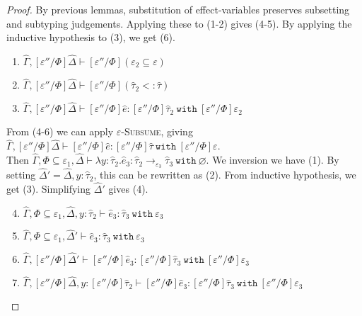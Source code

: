 \documentclass{llncs}
\newcommand{\keywadj}[1]{\mathtt{#1}}
\newcommand{\keyw}[1]{\keywadj{#1}~}
\newcommand{\kw}[1]{\keyw{ #1 }}
\begin{document}
\begin{proof}
By previous lemmas, substitution of effect-variables preserves subsetting and subtyping judgements. Applying these to (1-2) gives (4-5). By applying the inductive hypothesis to (3), we get (6).

\begin{enumerate}
	\item $\hat \Gamma, [\varepsilon''/\Phi]\hat \Delta \vdash [\varepsilon''/\Phi](\varepsilon_2 \subseteq \varepsilon)$
	\item $\hat \Gamma, [\varepsilon''/\Phi]\hat \Delta \vdash [\varepsilon''/\Phi](\hat \tau_2 <: \hat \tau)$
	\item $\hat \Gamma, [\varepsilon''/\Phi]\hat \Delta \vdash [\varepsilon''/\Phi]\hat e: [\varepsilon''/\Phi]\hat \tau_2~\kw{with} [\varepsilon''/\Phi]\varepsilon_2$
\end{enumerate}

From (4-6) we can apply \textsc{$\varepsilon$-Subsume}, giving $\hat \Gamma, [\varepsilon''/\Phi]\hat \Delta \vdash [\varepsilon''/\Phi]\hat e: [\varepsilon''/\Phi]\hat \tau~\kw{with} [\varepsilon''/\Phi]\varepsilon$.\\

 Then $\hat \Gamma, \Phi \subseteq \varepsilon_1, \hat \Delta \vdash \lambda y: \hat \tau_2. \hat e_3 : \hat \tau_2 \rightarrow_{\varepsilon_3} \hat \tau_3~\kw{with} \varnothing$. We inversion we have (1). By setting $\hat \Delta' = \hat \Delta, y: \hat \tau_2$, this can be rewritten as (2). From inductive hypothesis, we get (3). Simplifying $\hat \Delta'$ gives (4).

\begin{enumerate}
	\setcounter{enumi}{3}
	\item $\hat \Gamma, \Phi \subseteq \varepsilon_1, \hat \Delta, y: \hat \tau_2 \vdash \hat e_3: \hat \tau_3~\kw{with} \varepsilon_3$
	\item $\hat \Gamma, \Phi \subseteq \varepsilon_1, \hat \Delta' \vdash \hat e_3: \hat \tau_3~\kw{with} \varepsilon_3$
	\item $\hat \Gamma, [\varepsilon''/\Phi]\hat \Delta' \vdash [\varepsilon''/\Phi]\hat e_3: [\varepsilon''/\Phi]\hat \tau_3~\kw{with} [\varepsilon''/\Phi]\varepsilon_3$
	\item $\hat \Gamma, [\varepsilon''/\Phi]\hat \Delta, y: [\varepsilon''/\Phi]\hat \tau_2 \vdash [\varepsilon''/\Phi]\hat e_3: [\varepsilon''/\Phi]\hat \tau_3~\kw{with} [\varepsilon''/\Phi]\varepsilon_3$
\end{enumerate}


\end{proof}
\end{document}
